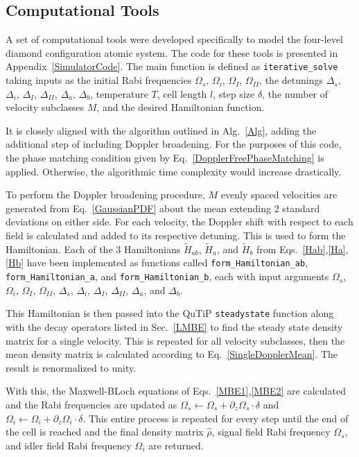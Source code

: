 \documentclass[aps,pra,showpacs,amsmath,amssymb,nofootinbib,longbibliography,superscriptaddress
]{revtex4-1}
\theoremstyle{definition}
\theoremstyle{remark}
\newcommand{\0}{\hat{0}}
\begin{document}
\subsection{Computational Tools}\label{ComputationalTools}

A set of computational tools were developed specifically to model the four-level diamond configuration atomic system. The code for these tools is presented in Appendix~\ref{SimulatorCode}. The main function is defined as \lstinline|iterative_solve| taking inputs as the initial Rabi frequencies $\Omega_s$, $\Omega_i$, $\Omega_I$, $\Omega_{II}$, the detunings $\Delta_s$, $\Delta_i$, $\Delta_I$, $\Delta_{II}$, $\Delta_a$, $\Delta_b$, temperature $T$, cell length $l$, step size $\delta$, the number of velocity subclasses $M$, and the desired Hamiltonian function.

It is closely aligned with the algorithm outlined in Alg.~\ref{Alg}, adding the additional step of including Doppler broadening. For the purposes of this code, the phase matching condition given by Eq.~\eqref{DopplerFreePhaseMatching} is applied. Otherwise, the algorithmic time complexity would increase drastically.

To perform the Doppler broadening procedure, $M$ evenly spaced velocities are generated from Eq.~\eqref{GaussianPDF} about the mean extending 2 standard deviations on either side. For each velocity, the Doppler shift with respect to each field is calculated and added to its respective detuning. This is used to form the Hamiltonian. Each of the 3 Hamiltonians $\tilde{H}_{ab}$, $\tilde{H}_{a}$, and $\tilde{H}_{b}$ from Eqs.~\eqref{Hab},\eqref{Ha},\eqref{Hb} have been implemented as functions called \lstinline|form_Hamiltonian_ab|, \lstinline|form_Hamiltonian_a|, and \lstinline|form_Hamiltonian_b|, each with input arguments $\Omega_s$, $\Omega_i$, $\Omega_I$, $\Omega_{II}$, $\Delta_s$, $\Delta_i$, $\Delta_I$, $\Delta_{II}$, $\Delta_a$, and $\Delta_b$.

This Hamiltonian is then passed into the QuTiP \lstinline|steadystate| function along with the decay operators listed in Sec.~\ref{LMBE} to find the steady state density matrix for a single velocity. This is repeated for all velocity subclasses, then the mean density matrix is calculated according to Eq.~\eqref{SingleDopplerMean}. The result is renormalized to unity.

With this, the Maxwell-BLoch equations of Eqs.~\eqref{MBE1},\eqref{MBE2} are calculated and the Rabi frequencies are updated as $\Omega_s \leftarrow \Omega_s + \partial_z \Omega_s \cdot \delta$ and $\Omega_i \leftarrow \Omega_i + \partial_z \Omega_i \cdot \delta$. This entire process is repeated for every step until the end of the cell is reached and the final density matrix $\hat{\rho}$, signal field Rabi frequency $\Omega_s$, and idler field Rabi frequency $\Omega_i$ are returned.
\end{document}
